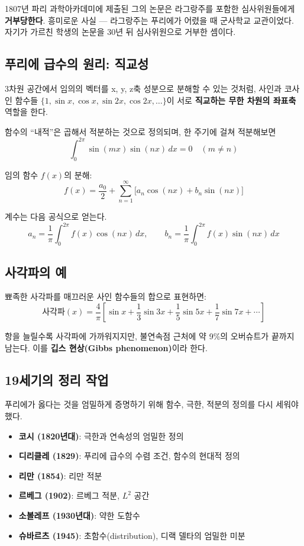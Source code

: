 \documentclass[11pt,a4paper]{article}
\begin{document}
1807년 파리 과학아카데미에 제출된 그의 논문은 라그랑주를 포함한 심사위원들에게 \textbf{거부당한다}. 흥미로운 사실 --- 라그랑주는 푸리에가 어렸을 때 군사학교 교관이었다. 자기가 가르친 학생의 논문을 30년 뒤 심사위원으로 거부한 셈이다.

\subsection{푸리에 급수의 원리: 직교성}

3차원 공간에서 임의의 벡터를 x, y, z축 성분으로 분해할 수 있는 것처럼, 사인과 코사인 함수들 $\{1, \sin x, \cos x, \sin 2x, \cos 2x, \ldots\}$이 서로 \textbf{직교하는 무한 차원의 좌표축} 역할을 한다.

함수의 ``내적''은 곱해서 적분하는 것으로 정의되며, 한 주기에 걸쳐 적분해보면
\[
\int_0^{2\pi} \sin(mx) \sin(nx)\, dx = 0 \quad (m \neq n)
\]

임의 함수 $f(x)$의 분해:
\begin{equation}
f(x) = \frac{a_0}{2} + \sum_{n=1}^{\infty} \bigl[ a_n \cos(nx) + b_n \sin(nx) \bigr]
\end{equation}

계수는 다음 공식으로 얻는다.
\[
a_n = \frac{1}{\pi}\int_0^{2\pi} f(x) \cos(nx)\, dx, \qquad b_n = \frac{1}{\pi}\int_0^{2\pi} f(x) \sin(nx)\, dx
\]

\subsection{사각파의 예}

뾰족한 사각파를 매끄러운 사인 함수들의 합으로 표현하면:
\[
\text{사각파}(x) = \frac{4}{\pi}\left[ \sin x + \frac{1}{3}\sin 3x + \frac{1}{5}\sin 5x + \frac{1}{7}\sin 7x + \cdots \right]
\]

항을 늘릴수록 사각파에 가까워지지만, 불연속점 근처에 약 9\%의 오버슈트가 끝까지 남는다. 이를 \textbf{깁스 현상(Gibbs phenomenon)}이라 한다.

\subsection{19세기의 정리 작업}

푸리에가 옳다는 것을 엄밀하게 증명하기 위해 함수, 극한, 적분의 정의를 다시 세워야 했다.

\begin{itemize}[leftmargin=*, itemsep=1pt]
  \item \textbf{코시 (1820년대)}: 극한과 연속성의 엄밀한 정의
  \item \textbf{디리클레 (1829)}: 푸리에 급수의 수렴 조건, 함수의 현대적 정의
  \item \textbf{리만 (1854)}: 리만 적분
  \item \textbf{르베그 (1902)}: 르베그 적분, $L^2$ 공간
  \item \textbf{소볼레프 (1930년대)}: 약한 도함수
  \item \textbf{슈바르츠 (1945)}: 초함수(distribution), 디랙 델타의 엄밀한 미분
\end{itemize}
\end{document}
